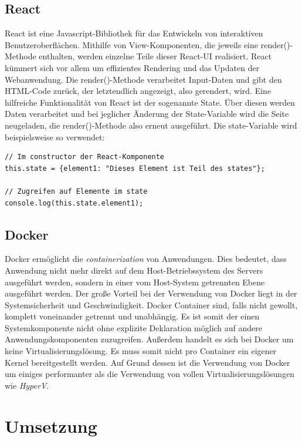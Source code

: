 \documentclass[12pt,a4paper]{report}
\begin{document}
\section{React}
React ist eine Javascript-Bibliothek für das Entwickeln von interaktiven Benutzeroberflächen. Mithilfe von View-Komponenten, die jeweils eine render()-Methode enthalten, werden einzelne Teile dieser React-UI realisiert. React kümmert sich vor allem um effizientes Rendering und das Updaten der Webanwendung.
Die render()-Methode verarbeitet Input-Daten und gibt den HTML-Code zurück, der letztendlich angezeigt, also gerendert, wird.
Eine hilfreiche Funktionalität von React ist der sogenannte State. Über diesen werden Daten verarbeitet und bei jeglicher Änderung der State-Variable wird die Seite neugeladen, die render()-Methode also erneut ausgeführt.
Die state-Variable wird beispielsweise so verwendet:

\begin{verbatim}
// Im constructor der React-Komponente
this.state = {element1: "Dieses Element ist Teil des states"};

// Zugreifen auf Elemente im state
console.log(this.state.element1);
\end{verbatim}


\section{Docker}

Docker ermöglicht die \textit{containerization} von Anwendungen. Dies bedeutet, dass Anwendung nicht mehr direkt auf dem Host-Betriebssystem des Servers ausgeführt werden, sondern in einer vom Host-System getrennten Ebene ausgeführt werden. Der große Vorteil bei der Verwendung von Docker liegt in der Systemsicherheit und Geschwindigkeit. Docker Container sind, falls nicht gewollt, komplett voneinander getrennt und unabhängig. Es ist somit der einen Systemkomponente nicht ohne explizite Deklaration möglich auf andere Anwendungskomponenten zuzugreifen. Außerdem handelt es sich bei Docker um keine Virtualisierungslösung. Es muss somit nicht pro Container ein eigener Kernel bereitgestellt werden. Auf Grund dessen ist die Verwendung von Docker um einiges performanter als die Verwendung von vollen Virtualisierungslösungen wie \textit{HyperV}.

\newpage
\chapter{Umsetzung}
\end{document}
